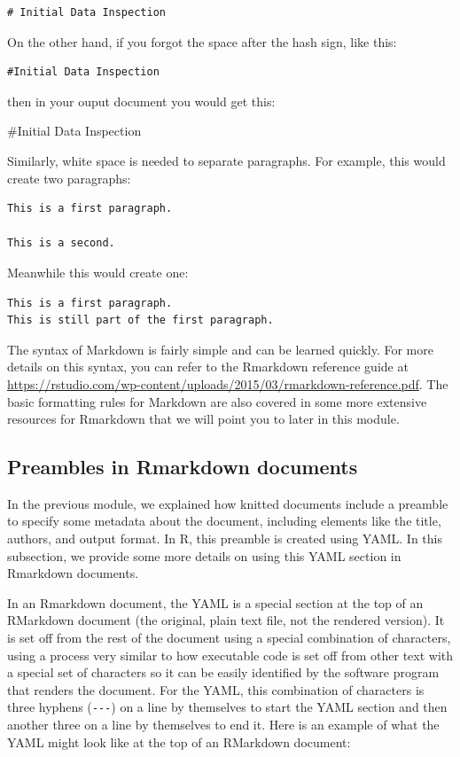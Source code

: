 \documentclass[]{tufte-book}
\begin{document}
\begin{verbatim}
# Initial Data Inspection
\end{verbatim}

On the other hand, if you forgot the space after the hash sign, like this:

\begin{verbatim}
#Initial Data Inspection
\end{verbatim}

then in your ouput document you would get this:

\#Initial Data Inspection

Similarly, white space is needed to separate paragraphs. For example, this would create two paragraphs:

\begin{verbatim}
This is a first paragraph. 

This is a second.
\end{verbatim}

Meanwhile this would create one:

\begin{verbatim}
This is a first paragraph.
This is still part of the first paragraph.
\end{verbatim}

The syntax of Markdown is fairly simple and can be learned quickly. For more
details on this syntax, you can refer to the Rmarkdown reference guide at
\url{https://rstudio.com/wp-content/uploads/2015/03/rmarkdown-reference.pdf}. The
basic formatting rules for Markdown are also covered in some more
extensive resources for Rmarkdown that we will point you to later in this
module.

\subsection{Preambles in Rmarkdown documents}\label{preambles-in-rmarkdown-documents}

In the previous module, we explained how knitted documents include a
preamble to specify some metadata about the document, including elements
like the title, authors, and output format. In R, this preamble is
created using YAML. In this subsection, we provide some more details
on using this YAML section in Rmarkdown documents.

In an Rmarkdown document, the YAML is a special section
at the top of an RMarkdown document (the original, plain text file, not the
rendered version). It is set off from the rest of the document using a special
combination of characters, using a process very similar to how executable code
is set off from other text with a special set of characters so it can be easily
identified by the software program that renders the document. For the YAML, this
combination of characters is three hyphens (\texttt{-\/-\/-}) on a line by themselves to
start the YAML section and then another three on a line by themselves to end it.
Here is an example of what the YAML might look like at the top of an RMarkdown
document:
\end{document}
